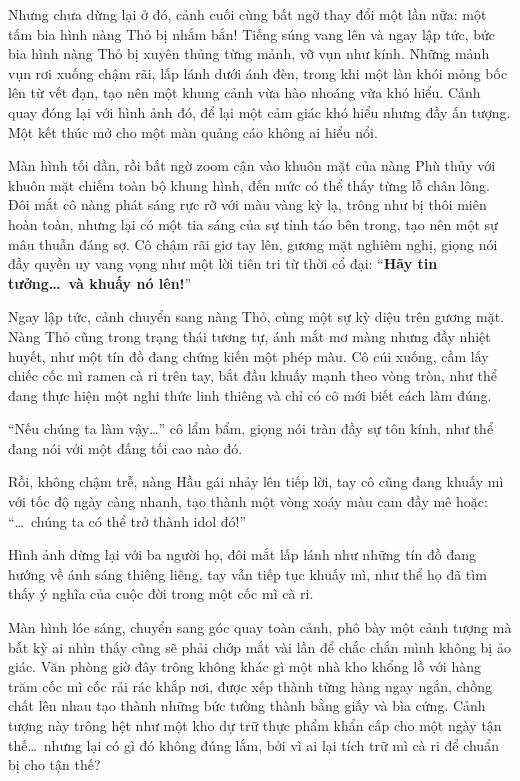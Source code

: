 \documentclass[../main.tex]{subfiles}
\begin{document}
Nhưng chưa dừng lại ở đó, cảnh cuối cùng bất ngờ thay đổi một lần nữa: một tấm bia hình nàng Thỏ bị nhắm bắn! Tiếng súng vang lên và ngay lập tức, bức bia hình nàng Thỏ bị xuyên thủng từng mảnh, vỡ vụn như kính. Những mảnh vụn rơi xuống chậm rãi, lấp lánh dưới ánh đèn, trong khi một làn khói mỏng bốc lên từ vết đạn, tạo nên một khung cảnh vừa hào nhoáng vừa khó hiểu. Cảnh quay đóng lại với hình ảnh đó, để lại một cảm giác khó hiểu nhưng đầy ấn tượng. Một kết thúc mở cho một màn quảng cáo không ai hiểu nổi.

\ct


Màn hình tối dần, rồi bất ngờ zoom cận vào khuôn mặt của nàng Phù thủy với khuôn mặt chiếm toàn bộ khung hình, đến mức có thể thấy từng lỗ chân lông. Đôi mắt cô nàng phát sáng rực rỡ với màu vàng kỳ lạ, trông như bị thôi miên hoàn toàn, nhưng lại có một tia sáng của sự tỉnh táo bên trong, tạo nên một sự mâu thuẫn đáng sợ. Cô chậm rãi giơ tay lên, gương mặt nghiêm nghị, giọng nói đầy quyền uy vang vọng như một lời tiên tri từ thời cổ đại: ``\textbf{Hãy tin tưởng\dots\ và khuấy nó lên!}''

Ngay lập tức, cảnh chuyển sang nàng Thỏ, cùng một sự kỳ diệu trên gương mặt. Nàng Thỏ cũng trong trạng thái tương tự, ánh mắt mơ màng nhưng đầy nhiệt huyết, như một tín đồ đang chứng kiến một phép màu. Cô cúi xuống, cầm lấy chiếc cốc mì ramen cà ri trên tay, bắt đầu khuấy mạnh theo vòng tròn, như thể đang thực hiện một nghi thức linh thiêng và chỉ có cô mới biết cách làm đúng.

``Nếu chúng ta làm vậy\dots'' cô lẩm bẩm, giọng nói tràn đầy sự tôn kính, như thể đang nói với một đấng tối cao nào đó.

Rồi, không chậm trễ, nàng Hầu gái nhảy lên tiếp lời, tay cô cũng đang khuấy mì với tốc độ ngày càng nhanh, tạo thành một vòng xoáy màu cam đầy mê hoặc: ``\dots\ chúng ta có thể trở thành idol đó!''

Hình ảnh dừng lại với ba người họ, đôi mắt lấp lánh như những tín đồ đang hướng về ánh sáng thiêng liêng, tay vẫn tiếp tục khuấy mì, như thể họ đã tìm thấy ý nghĩa của cuộc đời trong một cốc mì cà ri.

\ct


Màn hình lóe sáng, chuyển sang góc quay toàn cảnh, phô bày một cảnh tượng mà bất kỳ ai nhìn thấy cũng sẽ phải chớp mắt vài lần để chắc chắn mình không bị ảo giác. Văn phòng giờ đây trông không khác gì một nhà kho khổng lồ với hàng trăm cốc mì cốc rải rác khắp nơi, được xếp thành từng hàng ngay ngắn, chồng chất lên nhau tạo thành những bức tường thành bằng giấy và bìa cứng. Cảnh tượng này trông hệt như một kho dự trữ thực phẩm khẩn cấp cho một ngày tận thế\dots\ nhưng lại có gì đó không đúng lắm, bởi vì ai lại tích trữ mì cà ri để chuẩn bị cho tận thế?
\end{document}
